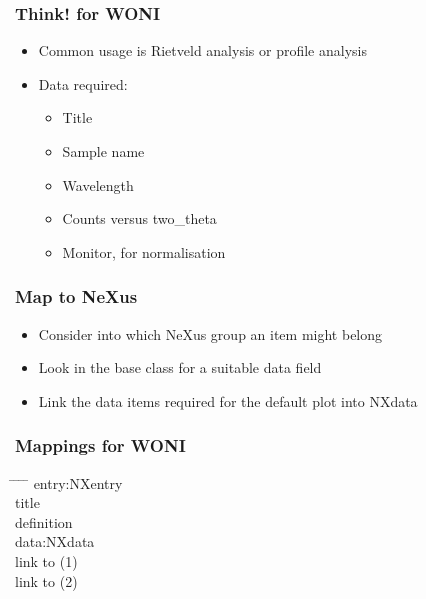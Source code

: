 \documentclass{beamer}
\begin{document}
\begin{frame}
\frametitle{Think! for WONI}
\begin{itemize}
\item Common usage is Rietveld analysis or profile analysis
\item Data required:
\begin{itemize}
\item Title
\item Sample name
\item Wavelength
\item Counts versus two\_theta
\item Monitor, for normalisation
\end{itemize}
\end{itemize}
\end{frame}

\begin{frame}
\frametitle{Map to NeXus}
\begin{itemize}
\item Consider into which NeXus group an item might belong
\item Look in the base class for a suitable data field
\item Link the data items required for the default plot into NXdata
\end{itemize}
\end{frame}

\begin{frame} \frametitle{Mappings for WONI}
\begin{tabbing}
\hspace*{1cm} \= \hspace*{1cm} \= \hspace*{1cm} \= \hspace*{1cm} \= \kill
{} {
entry:NXentry \\
\>title\\
\>definition\\
}
 {
\>data:NXdata\\
\> \>link to (1)\\
\> \>link to (2)\\
}
 \end{tabbing}
\end{frame}
\end{document}
